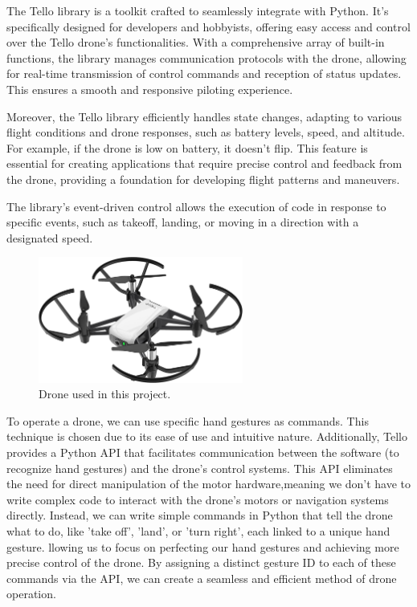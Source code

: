 The Tello library is a toolkit crafted to seamlessly integrate with Python. It's specifically designed for developers and hobbyists, offering easy access and control over the Tello drone's functionalities. With a comprehensive array of built-in functions, the library manages communication protocols with the drone, allowing for real-time transmission of control commands and reception of status updates. This ensures a smooth and responsive piloting experience.

Moreover, the Tello library efficiently handles state changes, adapting to various flight conditions and drone responses, such as battery levels, speed, and altitude. For example, if the drone is low on battery, it doesn't flip. This feature is essential for creating applications that require precise control and feedback from the drone, providing a foundation for developing flight patterns and maneuvers.

The library's event-driven control allows the execution of code in response to specific events, such as takeoff, landing, or moving in a direction with a designated speed.

\begin{figure}[h!]
	\centering
	\includegraphics[width = 0.6\textwidth]{images/drone.jpg}
	\caption{Drone used in this project.}
	\label{fig:tello}
\end{figure}

To operate a drone, we can use specific hand gestures as commands. This technique is chosen due to its ease of use and intuitive nature. Additionally, Tello provides a Python API that facilitates communication between the software (to recognize hand gestures) and the drone's control systems.
This API eliminates the need for direct manipulation of the motor hardware,meaning we don't have to write complex code to interact with the drone's motors or navigation systems directly.  Instead, we can write simple commands in Python that tell the drone what to do, like 'take off', 'land', or 'turn right', each linked to a unique hand gesture. 
llowing us to focus on perfecting our hand gestures and achieving more precise control of the drone. By assigning a distinct gesture ID to each of these commands via the API, we can create a seamless and efficient method of drone operation.



